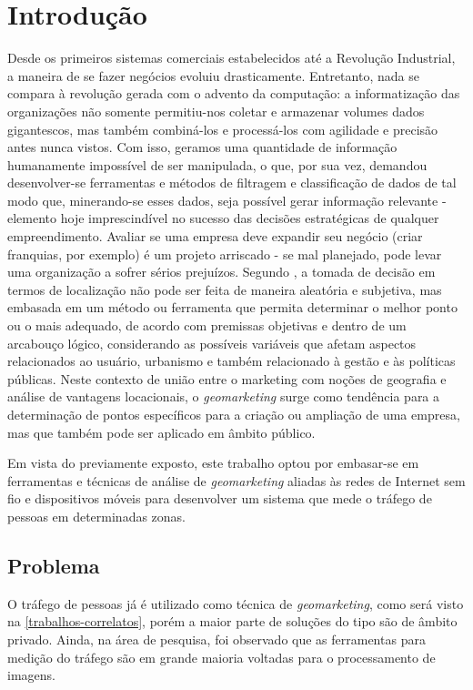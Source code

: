 
\chapter{Introdução}
\label{introducao}

Desde os primeiros sistemas comerciais estabelecidos até a Revolução Industrial,
a maneira de se fazer negócios evoluiu drasticamente. Entretanto, nada se
compara à revolução gerada com o advento da computação: a informatização das
organizações não somente permitiu-nos coletar e armazenar volumes dados
gigantescos, mas também combiná-los e processá-los com agilidade e precisão antes nunca
vistos. Com isso, geramos uma quantidade de informação humanamente impossível de
ser manipulada, o que, por sua vez, demandou desenvolver-se ferramentas e
métodos de filtragem e classificação de dados de tal modo que, minerando-se esses dados, seja possível gerar
informação relevante - elemento hoje imprescindível no sucesso
das decisões estratégicas de qualquer empreendimento. Avaliar se uma empresa
deve expandir seu negócio (criar franquias, por exemplo) é um projeto
arriscado - se mal planejado, pode levar uma organização a sofrer sérios
prejuízos. Segundo , a tomada de decisão em termos de
localização não pode ser feita de maneira aleatória e subjetiva, mas embasada em
um método ou ferramenta que permita determinar o melhor ponto ou o mais
adequado, de acordo com premissas objetivas e dentro de um arcabouço lógico,
considerando as possíveis variáveis que afetam aspectos relacionados ao usuário,
urbanismo e também relacionado à gestão e às políticas públicas. Neste contexto
de união entre o marketing com noções de geografia e análise de vantagens
locacionais, o \emph{geomarketing} surge como tendência para a determinação de
pontos específicos para a criação ou ampliação de uma empresa, mas que também pode ser aplicado em âmbito público.

Em vista do previamente exposto, este trabalho optou por embasar-se em
ferramentas e técnicas de análise de \emph{geomarketing} aliadas às redes de
Internet sem fio e dispositivos móveis para desenvolver
um sistema que mede o tráfego de pessoas em determinadas zonas.

\section{Problema}
O tráfego de pessoas já é utilizado como técnica de \emph{geomarketing}, como será visto na \autoref{trabalhos-correlatos}, porém
a maior parte de soluções do tipo são de âmbito privado. Ainda, na área de pesquisa, foi observado que as ferramentas para medição do tráfego
são em grande maioria voltadas para o processamento de imagens.

